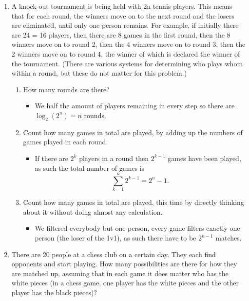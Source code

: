 \documentclass{article}
\begin{document}
\begin{enumerate}
\begin{enumerate}
\begin{itemize}
				\end{itemize}
		\end{enumerate}
	\item A knock-out tournament is being held with 2n tennis players. This means that for each round, the winners move on to the next round and the losers are eliminated, until only one person remains. For example, if initially there are 24 = 16 players, then there are 8 games in the first round, then the 8 winners move on to round 2, then the 4 winners move on to round 3, then the 2 winners move on to round 4, the winner of which is declared the winner of the tournament. (There are various systems for determining who plays whom within a round, but these do not matter for this problem.)
		\begin{enumerate}
			\item How many rounds are there?
				\begin{itemize}
					\item We half the amount of players remaining in every step so there are $\log_2(2^n) = n$ rounds. 
				\end{itemize}
			\item Count how many games in total are played, by adding up the numbers of games played in each round.
				\begin{itemize}
					\item If there are $2^k$ players in a round then $2^{k - 1}$ games have been played, as such the total number of games is
					$$
					\sum_{k = 1}^n 2^{k - 1} = 2^n - 1.
					$$
				\end{itemize}
			\item Count how many games in total are played, this time by directly thinking about it without doing almost any calculation.
				\begin{itemize}
					\item We filtered everybody but one person, every game filters exactly one person (the loser of the 1v1), as such there have to be $2^{n - 1}$ matches.
				\end{itemize}
		\end{enumerate}
	\item There are 20 people at a chess club on a certain day. They each find opponents and start playing. How many possibilities are there for how they are matched up, assuming that in each game it does matter who has the white pieces (in a chess game, one player has the white pieces and the other player has the black pieces)?
		\begin{itemize}

\end{itemize}
\end{enumerate}
\end{document}

